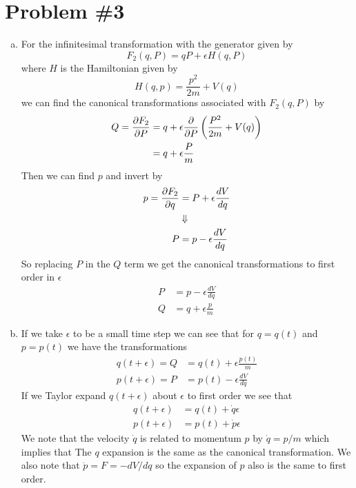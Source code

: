 \documentclass[11pt]{article}
\numberwithin{equation}{section}
\begin{document}
\section{Problem \#3}
\begin{enumerate}[(a)]
\item
For the infinitesimal transformation with the generator given by
$$F_2(q,P) = qP + \epsilon{H(q,P)}$$
where $H$ is the Hamiltonian given by
$$H(q,p) = \frac{p^2}{2m} + V(q)$$
we can find the canonical transformations associated with $F_2(q,P)$ by 
\begin{align*}
Q = \frac{\partial{F_2}}{\partial{P}} &= q + \epsilon\frac{\partial{}}{\partial{P}}\left(\frac{P^2}{2m} + V(q)\right)\\
&= q + \epsilon\frac{P}{m}
\end{align*}
Then we can find $p$ and invert by
\begin{align*}
p = \frac{\partial{F_2}}{\partial{q}} &= P + \epsilon\frac{dV}{dq}\\
&\Downarrow\\
P &= p - \epsilon\frac{dV}{dq}
\end{align*}
So replacing $P$ in the $Q$ term we get the canonical transformations to first order in $\epsilon$
\begin{align*}
P &= p - \epsilon\frac{dV}{dq}\\
Q &= q + \epsilon\frac{p}{m}
\end{align*}

\item If we take $\epsilon$ to be a small time step we can see that for $q=q(t)$ and $p=p(t)$
we have the transformations
\begin{align*}
q(t+\epsilon) = Q &= q(t) + \epsilon\frac{p(t)}{m}\\
p(t+\epsilon) = P &= p(t) - \epsilon\frac{dV}{dq}
\end{align*}
If we Taylor expand $q(t+\epsilon)$ about $\epsilon$ to first order we see that
\begin{align*}
q(t+\epsilon) &= q(t) + \dot{q}\epsilon\\
p(t+\epsilon) &= p(t) + \dot{p}\epsilon
\end{align*}
We note that the velocity $\dot{q}$ is related to momentum $p$ by $\dot{q}=p/m$ which implies
that The $q$ expansion is the same as the canonical transformation. We also note that 
$\dot{p} = F = -dV/dq$ so the expansion of $p$ also is the same to first order.


\end{enumerate}
\end{document}
